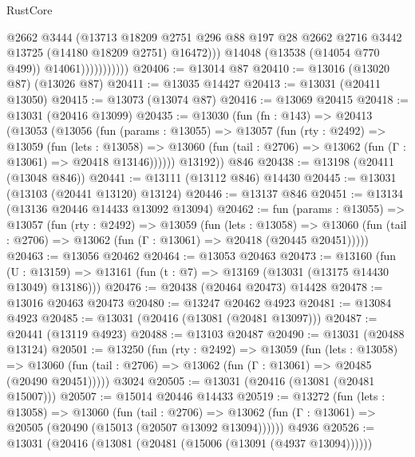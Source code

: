 \begin{lexlean}{RustCore}
\begin{coremodule}
                              @2662
                              @3444
                              (@13713
                                @18209
                                @2751
                                @296
                                @88
                                @197
                                @28
                                @2662
                                @2716
                                @3442
                                @13725
                                (@14180 @18209 @2751)
                                @16472)))
                          @14048
                          (@13538 (@14054 @770 @499))
                          @14061)))))))))))
@20406 := @13014 @87
@20410 := @13016 (@13020 @87) (@13026 @87)
@20411 := @13035 @14427
@20413 := @13031 (@20411 @13050)
@20415 := @13073 (@13074 @87)
@20416 := @13069 @20415
@20418 := @13031 (@20416 @13099)
@20435 := @13030
    (fun (fn : @143) =>
    @20413
      (@13053
        (@13056
          (fun (params : @13055) =>
          @13057
            (fun (rty : @2492) =>
            @13059
              (fun (lets : @13058) =>
              @13060 (fun (tail : @2706) => @13062 (fun (Γ : @13061) => @20418 @13146))))))
        @13192))
    @846
@20438 := @13198 (@20411 (@13048 @846))
@20441 := @13111 (@13112 @846) @14430
@20445 := @13031 (@13103 (@20441 @13120) @13124)
@20446 := @13137 @846
@20451 := @13134 (@13136 @20446 @14433 @13092 @13094)
@20462 := fun (params : @13055) =>
  @13057
    (fun (rty : @2492) =>
    @13059
      (fun (lets : @13058) =>
      @13060 (fun (tail : @2706) => @13062 (fun (Γ : @13061) => @20418 (@20445 @20451)))))
@20463 := @13056 @20462
@20464 := @13053 @20463
@20473 := @13160
    (fun (U : @13159) => @13161 (fun (t : @7) => @13169 (@13031 (@13175 @14430 @13049) @13186)))
@20476 := @20438 (@20464 @20473) @14428
@20478 := @13016 @20463 @20473
@20480 := @13247 @20462 @4923
@20481 := @13084 @4923
@20485 := @13031 (@20416 (@13081 (@20481 @13097)))
@20487 := @20441 (@13119 @4923)
@20488 := @13103 @20487
@20490 := @13031 (@20488 @13124)
@20501 := @13250
    (fun (rty : @2492) =>
    @13059
      (fun (lets : @13058) =>
      @13060 (fun (tail : @2706) => @13062 (fun (Γ : @13061) => @20485 (@20490 @20451)))))
    @3024
@20505 := @13031 (@20416 (@13081 (@20481 @15007)))
@20507 := @15014 @20446 @14433
@20519 := @13272
    (fun (lets : @13058) =>
    @13060
      (fun (tail : @2706) =>
      @13062 (fun (Γ : @13061) => @20505 (@20490 (@15013 (@20507 @13092 @13094))))))
    @4936
@20526 := @13031 (@20416 (@13081 (@20481 (@15006 (@13091 (@4937 @13094))))))

\end{coremodule}
\end{lexlean}
